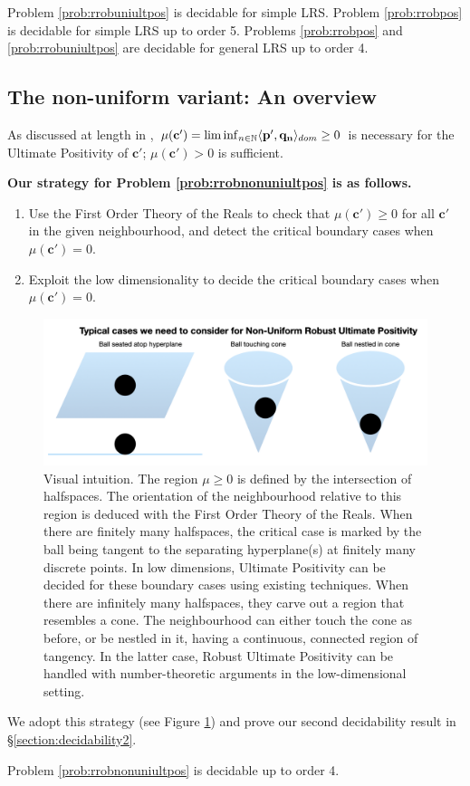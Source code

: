 \begin{theorem}
\label{thm:decide}
Problem \ref{prob:rrobuniultpos} is decidable for simple LRS. Problem \ref{prob:rrobpos} is decidable for simple LRS up to order 5. Problems \ref{prob:rrobpos} and \ref{prob:rrobuniultpos} are decidable for general LRS up to order 4.
\end{theorem}

\subsection{The non-uniform variant: An overview}
\label{section:nonuniformoverview}
As discussed at length in \cite{originalstacs,originalarxiv}, $\mu(\mathbf{c'})= \liminf_{n \in \mathbb{N}} \langle\mathbf{p'}, \mathbf{q_n}\rangle_{dom} \ge 0$ is necessary for the Ultimate Positivity of $\mathbf{c'}$; $\mu(\mathbf{c'}) > 0$ is sufficient.

\textbf{Our strategy for Problem \ref{prob:rrobnonuniultpos} is as follows.}
\begin{enumerate}
\item Use the First Order Theory of the Reals to check that $\mu(\mathbf{c'}) \ge 0$ for all $\mathbf{c'}$ in the given neighbourhood, and detect the critical boundary cases when $\mu(\mathbf{c'}) = 0$.
\item Exploit the low dimensionality to decide the critical boundary cases when $\mu(\mathbf{c'}) = 0$.
\end{enumerate}

\begin{figure}[h]

\includegraphics[width=\textwidth]{picture1.png}
\caption{Visual intuition. The region $\mu \ge 0$ is defined by the intersection of halfspaces. The orientation of the neighbourhood relative to this region is deduced with the First Order Theory of the Reals. When there are finitely many halfspaces, the critical case is marked by the ball being tangent to the separating hyperplane(s) at finitely many discrete points. In low dimensions, Ultimate Positivity can be decided for these boundary cases using existing techniques. When there are infinitely many halfspaces, they carve out a region that resembles a cone. The neighbourhood can either touch the cone as before, or be nestled in it, having a continuous, connected region of tangency. In the latter case, Robust Ultimate Positivity can be handled with number-theoretic arguments in the low-dimensional setting.}
\label{fig:geometricpicture}
\end{figure}

We adopt this strategy (see Figure \ref{fig:geometricpicture}) and prove our second decidability result in \S\ref{section:decidability2}.
\begin{theorem}
\label{thm:decide2}
Problem \ref{prob:rrobnonuniultpos} is decidable up to order 4.
\end{theorem}




